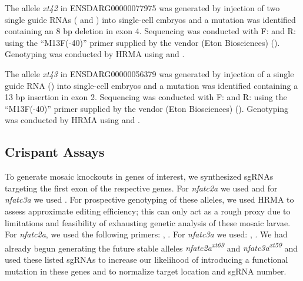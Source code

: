 The allele \textit{xt42} in ENSDARG00000077975 was generated by injection of two single guide RNAs ( and ) into single-cell embryos and a mutation was identified containing an 8 bp deletion in exon 4. Sequencing was conducted with F:  and R:  using the ``M13F(\hyp{}40)'' primer supplied by the vendor (Eton Biosciences) (). Genotyping was conducted by HRMA using  and .

The allele \textit{xt43} in ENSDARG00000056379 was generated by injection of a single guide RNA () into single-cell embryos and a mutation was identified containing a 13 bp insertion in exon 2. Sequencing was conducted with F:  and R:  using the ``M13F(\hyp{}40)'' primer supplied by the vendor (Eton Biosciences) (). Genotyping was conducted by HRMA using  and .

\subsection{Crispant Assays}\label{crispants}

To generate mosaic knockouts in genes of interest, we synthesized sgRNAs targeting the first exon of the respective genes. For \textit{nfatc2a} we used  and for \textit{nfatc3a} we used . For prospective genotyping of these alleles, we used HRMA to assess approximate editing efficiency; this can only act as a rough proxy due to limitations and feasibility of exhausting genetic analysis of these mosaic larvae. For \textit{nfatc2a}, we used the following primers: , . For \textit{nfatc3a} we used: , . We had already begun generating the future stable alleles \textit{nfatc2a\textsuperscript{xt69}} and \textit{nfatc3a\textsuperscript{xt59}} and used these listed sgRNAs to increase our likelihood of introducing a functional mutation in these genes and to normalize target location and sgRNA number.

